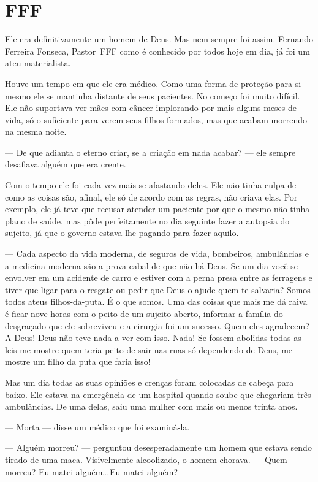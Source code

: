 \chapter{FFF}

Ele era definitivamente um homem de Deus. Mas nem sempre foi assim. Fernando Ferreira Fonseca, Pastor~FFF\mudanca{,} como é conhecido por todos hoje em dia, já foi um ateu materialista.

Houve um tempo em que ele era médico. Como uma forma de proteção para si mesmo ele se mantinha distante de seus pacientes. No começo foi muito difícil. Ele não suportava ver mães com câncer implorando por mais alguns meses de vida, só o suficiente para verem seus filhos formados, mas que acabam morrendo na mesma noite.

--- De que adianta o eterno criar, se a criação em nada acabar? --- ele sempre desafiava alguém que era crente.

Com o tempo ele foi cada vez mais se afastando deles. Ele não tinha culpa de como as coisas são, afinal, ele só  de acordo com as regras, não criava elas. Por exemplo, ele já teve que recusar atender um paciente por que o mesmo não tinha plano de saúde, mas pôde perfeitamente no dia seguinte fazer a autopsia do sujeito, já que o governo estava lhe pagando para fazer aquilo.

--- Cada aspecto da vida moderna, de seguros de vida, bombeiros, ambulâncias e a medicina moderna são a prova cabal de que não há Deus. Se um dia você se envolver em um acidente de carro e estiver com a perna presa entre as ferragens e tiver que ligar para o resgate ou pedir que Deus o ajude quem te salvaria? Somos todos ateus filhos-da-puta. É o que somos. Uma das coisas que mais me dá raiva é ficar nove horas com o peito de um sujeito aberto, informar a família do desgraçado que ele sobreviveu e a cirurgia foi um sucesso. Quem eles agradecem? A Deus! Deus não teve nada a ver com isso. Nada! Se fossem abolidas todas as leis me mostre quem teria peito de sair nas ruas só dependendo de Deus, me mostre um filho da puta que faria isso!

Mas um dia todas as suas opiniões e crenças foram colocadas de cabeça para baixo. Ele estava na emergência de um hospital quando soube que chegariam três ambulâncias. De uma delas, saiu uma mulher com mais ou menos trinta anos.

--- Morta --- disse um médico que foi examiná-la.

--- Alguém morreu? ---  perguntou desesperadamente um homem que estava sendo tirado de uma maca. Visivelmente alcoolizado, o homem chorava. --- Quem morreu? Eu matei alguém\ldots\,Eu matei alguém?

